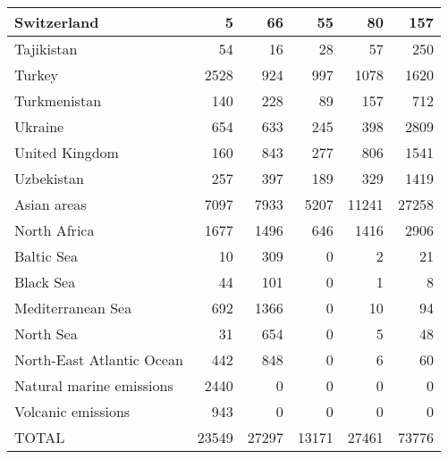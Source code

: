 \begin{table}
\begin{center}
\begin{tabular}{|l|r|r|r|r|r|}
                   Switzerland&     5&    66&    55&    80&   157 \\\hline
                    Tajikistan&    54&    16&    28&    57&   250 \\\hline
                        Turkey&  2528&   924&   997&  1078&  1620 \\\hline
                  Turkmenistan&   140&   228&    89&   157&   712 \\\hline
                       Ukraine&   654&   633&   245&   398&  2809 \\\hline
                United Kingdom&   160&   843&   277&   806&  1541 \\\hline
                    Uzbekistan&   257&   397&   189&   329&  1419 \\\hline
                   Asian areas&  7097&  7933&  5207& 11241& 27258 \\\hline
                  North Africa&  1677&  1496&   646&  1416&  2906 \\\hline
                    Baltic Sea&    10&   309&     0&     2&    21 \\\hline
                     Black Sea&    44&   101&     0&     1&     8 \\\hline
             Mediterranean Sea&   692&  1366&     0&    10&    94 \\\hline
                     North Sea&    31&   654&     0&     5&    48 \\\hline
     North-East Atlantic Ocean&   442&   848&     0&     6&    60 \\\hline
      Natural marine emissions&  2440&     0&     0&     0&     0 \\\hline
            Volcanic emissions&   943&     0&     0&     0&     0 \\\hline\hline
                         TOTAL& 23549& 27297& 13171& 27461& 73776 \\\hline

\end{tabular}
\end{center}
\end{table}


\clearpage
 
